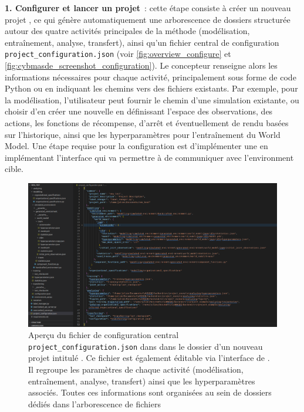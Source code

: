 \textbf{1. Configurer et lancer un projet}~: cette étape consiste à créer un nouveau projet , ce qui génère automatiquement une arborescence de dossiers structurée autour des quatre activités principales de la méthode  (modélisation, entraînement, analyse, transfert), ainsi qu'un fichier central de configuration \texttt{project\_configuration.json} (voir \autoref{fig:overview_configure} et \autoref{fig:cybmasde_screenshot_configuration}). Le concepteur renseigne alors les informations nécessaires pour chaque activité, principalement sous forme de code Python ou en indiquant les chemins vers des fichiers existants. Par exemple, pour la modélisation, l'utilisateur peut fournir le chemin d'une simulation existante, ou choisir d'en créer une nouvelle en définissant l'espace des observations, des actions, les fonctions de récompense, d'arrêt et éventuellement de rendu basées sur l'historique, ainsi que les hyperparamètres pour l'entraînement du World Model. Une étape requise pour la configuration est d'implémenter une  en implémentant l'interface  qui va permettre à  de communiquer avec l'environment cible.

\begin{figure}[h!]
  \centering
  \includegraphics[width=\linewidth]{figures/cybmasde_configuration_overview.png}
  \caption{Aperçu du fichier de configuration central \texttt{project\_configuration.json} dans  dans le dossier d'un nouveau projet intitulé . Ce fichier est également éditable via l'interface de . Il regroupe les paramètres de chaque activité (modélisation, entraînement, analyse, transfert) ainsi que les hyperparamètres associés. Toutes ces informations sont organisées au sein de dossiers dédiés dans l'arborescence de fichiers}
  \label{fig:overview_configure}
\end{figure}

